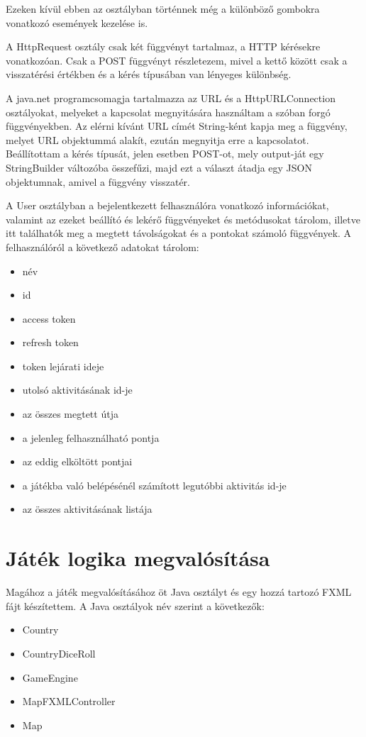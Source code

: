 Ezeken kívül ebben az osztályban történnek még a különböző gombokra vonatkozó események kezelése is. 

A HttpRequest osztály csak két függvényt tartalmaz, a HTTP kérésekre vonatkozóan. Csak a POST függvényt részletezem, mivel a kettő között csak a visszatérési értékben és a kérés típusában van lényeges különbség. 

A java.net programcsomagja tartalmazza az URL és a HttpURLConnection osztályokat, melyeket a kapcsolat megnyitására használtam a szóban forgó függvényekben. Az elérni kívánt URL címét String-ként kapja meg a függvény, melyet URL objektummá alakít, ezután megnyitja erre a kapcsolatot. Beállítottam a kérés típusát, jelen esetben POST-ot, mely output-ját egy StringBuilder változóba összefűzi, majd ezt a választ átadja egy JSON objektumnak, amivel a függvény visszatér. 

A User osztályban a bejelentkezett felhasználóra vonatkozó információkat, valamint az ezeket beállító és lekérő függvényeket és metódusokat tárolom, illetve itt találhatók meg a megtett távolságokat és a pontokat számoló függvények. A felhasználóról a következő adatokat tárolom: 

\begin{itemize}
\item név 
\item id 
\item access token 
\item refresh token 
\item token lejárati ideje 
\item utolsó aktivitásának id-je 
\item az összes megtett útja 
\item a jelenleg felhasználható pontja 
\item az eddig elköltött pontjai 
\item a játékba való belépésénél számított legutóbbi aktivitás id-je 
\item az összes aktivitásának listája
\end{itemize}

\section{Játék logika megvalósítása}

Magához a játék megvalósításához öt Java osztályt és egy hozzá tartozó FXML fájt készítettem. A Java osztályok név szerint a következők: 

\begin{itemize}
\item Country 
\item CountryDiceRoll 
\item GameEngine 
\item MapFXMLController 
\item Map 
\end{itemize}

